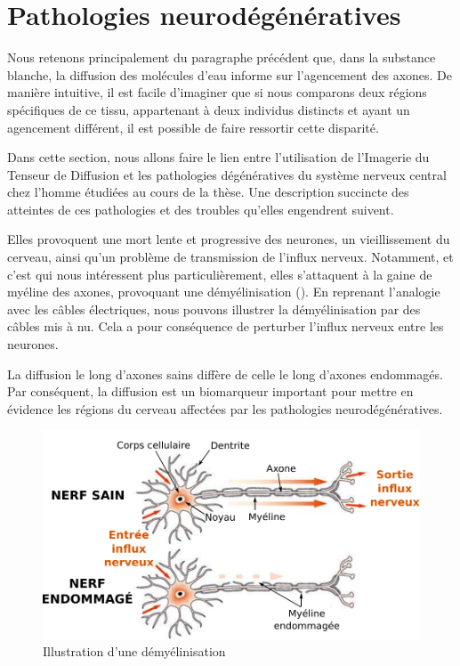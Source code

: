 \section{Pathologies neurodégénératives}
Nous retenons principalement du paragraphe précédent que, dans la substance blanche, la diffusion des molécules d'eau informe sur l'agencement des axones.
De manière intuitive, il est facile d'imaginer que si nous comparons deux régions spécifiques de ce tissu, 
appartenant à deux individus distincts et ayant un agencement différent,
il est possible de faire ressortir cette disparité.

Dans cette section, nous allons faire le lien entre l'utilisation de l'Imagerie du Tenseur de Diffusion
et les pathologies dégénératives du système nerveux central chez l'homme étudiées au cours de la thèse.
Une description succincte des atteintes de ces pathologies et des troubles qu'elles engendrent suivent.

Elles provoquent une mort lente et progressive des neurones, un vieillissement du cerveau,
ainsi qu'un problème de transmission de l'influx nerveux.
Notamment, et c'est qui nous intéressent plus particulièrement, elles s'attaquent à la gaine de myéline des axones, provoquant une \og démyélinisation \fg ().
En reprenant l'analogie avec les câbles électriques, nous pouvons illustrer la démyélinisation par des câbles mis à nu.
Cela a pour conséquence de perturber l'influx nerveux entre les neurones.

La diffusion le long d'axones sains diffère de celle le long d'axones endommagés.
Par conséquent, la diffusion est un biomarqueur important pour mettre en évidence les régions du cerveau affectées par les pathologies neurodégénératives.



% 

\begin{figure}[ht]
    \centering
    \includegraphics[width=1\textwidth]{Images/neurone.pdf}
    \caption{\label{fig:neurone}Illustration d'une démyélinisation}
\end{figure}

